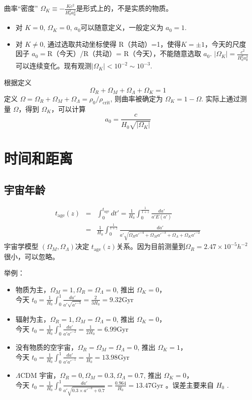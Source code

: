\documentclass[]{ctexart}
\begin{document}
曲率“密度” $\Omega_K\equiv-\frac{Kc^2}{H_0^2a_0^2}$是形式上的，不是实质的物质。
\begin{itemize}
    \item 对 $K=0$, $\Omega_K=0$, $a_0$可以随意定义，一般定义为 $a_0=1$.
    \item 对 $K\neq0$, 通过选取共动坐标使得 R（共动）=1，使得$K=\pm 1$，今天的尺度因子 $a_0=$R（今天）/R（共动）= R（今天），不能随意选取 $a_0$. $|\Omega_K|=\frac{c^2}{H_0^2a_0^2}$ 可以连续变化。现有观测$|\Omega_K|< 10^{-2}\sim 10^{-3}$.
\end{itemize} 

根据定义
\begin{equation}
    \Omega_R + \Omega_M + \Omega_\Lambda + \Omega_K = 1 
\end{equation}
定义 $\Omega=\Omega_R + \Omega_M + \Omega_\Lambda = \rho_0/\rho_\text{crit}$, 则曲率被确定为 $\Omega_K = 1-\Omega$.  实际上通过测量 $\Omega$，得到 $\Omega_K$，可以计算
\begin{equation}
    a_0=\frac{c}{H_0\sqrt{|\Omega_K|}} 
\end{equation} 

\section{时间和距离}
\subsection{宇宙年龄}

\begin{eqnarray}
    t_\text{age}(z) &=& \int_0^{t_\text{age}} dt' = \frac{1}{H_0}\int_0^\frac{1}{1+z} \frac{da'}{a' E(a')} \\ 
    &=& \frac{1}{H_0}\int_0^\frac{1}{1+z} \frac{da'}{a' \sqrt{\Omega_R a'^{-4}+\Omega_M a'^{-3}+\Omega_\Lambda+\Omega_K a'^{-2}}}
\end{eqnarray}
宇宙学模型 $\left(\Omega_M, \Omega_\Lambda\right) $决定 $t_\text{age}(z)$关系。因为目前测量到$\Omega_R = 2.47\times10^{-5}h^{-2}$很小，可以忽略。

举例：
\begin{itemize}
    \item 物质为主，$\Omega_M=1, \Omega_R=\Omega_\Lambda=0$, 推出 $\Omega_K=0$，\\今天 $t_0=\frac{1}{H_0}\int_0^1 \frac{da'}{a' \sqrt{a'^{-3}}}=\frac{2}{3 H_0}=9.32 \mathrm{Gyr}$ 
    \item 辐射为主，$\Omega_R=1, \Omega_M=\Omega_\Lambda=0$, 推出 $\Omega_K=0$，\\今天 $t_0=\frac{1}{H_0}\int_0^1 \frac{da'}{a' a'^{-2}}=\frac{1}{2 H_0}=6.99 \mathrm{Gyr}$ 
    \item 没有物质的空宇宙，$\Omega_R=\Omega_M=\Omega_\Lambda=0$, 推出 $\Omega_K=1$，\\今天 $t_0=\frac{1}{H_0}\int_0^1 \frac{da'}{a' a'^{-1}}=\frac{1}{ H_0}=13.98 \mathrm{Gyr}$ 
    \item $\Lambda$CDM 宇宙，$\Omega_R=0, \Omega_M=0.3,\Omega_\Lambda=0.7$, 推出 $\Omega_K=0$，\\今天 $t_0=\frac{1}{H_0}\int_0^1 \frac{da'}{a' \sqrt{0.3\times a'^{-3}+0.7} }=\frac{0.964}{ H_0}=13.47 \mathrm{Gyr}$ 。误差主要来自 $H_0$ .
\end{itemize}
\end{document}
